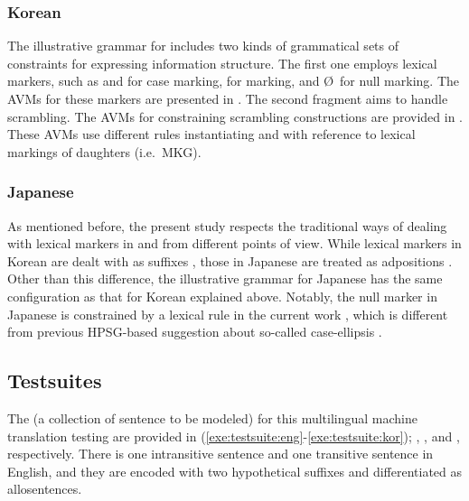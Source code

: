 \subsubsection{Korean}
\label{13:ssec:kor}


The illustrative grammar for  includes two kinds of
grammatical sets of constraints for expressing information
structure. The first one employs lexical markers, such as \ika and
\lul for case marking, \nun for  marking, and {\O}~for null
marking. The AVMs for these markers are presented in
 .  The second fragment
aims to handle scrambling. The AVMs for constraining scrambling
constructions are provided in
 . These AVMs use different
rules instantiating  and 
with reference to lexical markings of daughters (i.e.\ MKG).


\subsubsection{Japanese}
\label{13:ssec:jpn}



As mentioned before, the present study respects the
traditional ways of dealing with lexical markers in  and
 from different points of view. While lexical markers in
Korean are dealt with as suffixes \citep{kim:yang:04}, those in
Japanese are treated as adpositions \citep[among
  others]{siegel:99}. Other
than this difference, the illustrative grammar for Japanese has the
same configuration as that for Korean explained above. Notably, the
null marker in Japanese is constrained by a lexical rule in the
current work , which is different from previous
HPSG-based suggestion about so-called case-ellipsis
\citep{yatabe:99,sato:tam:12}.




\subsection{Testsuites}
\label{13:ssec:testsuites}


The  (a collection of sentence to be modeled) for this
multilingual machine translation testing are provided in
(\ref{exe:testsuite:eng}-\ref{exe:testsuite:kor}); , ,
and , respectively.  There is one intransitive sentence and one
transitive sentence in English, and they are encoded with two
hypothetical suffixes and differentiated as allosentences.



